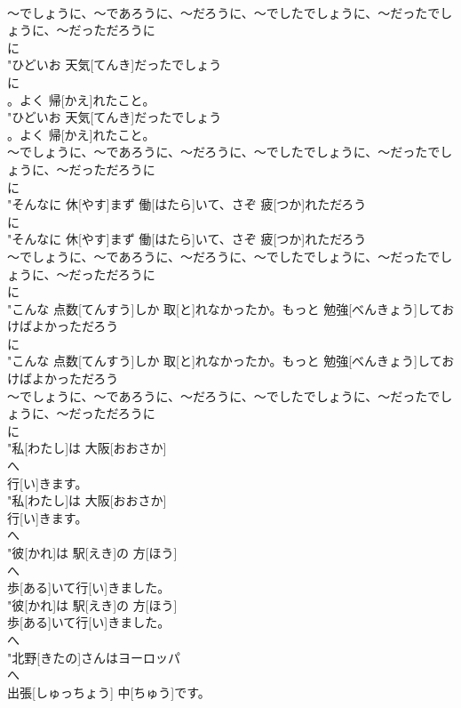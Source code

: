 \documentclass[8pt]{extreport}
\begin{document}
\begin{CJK}{UTF8}{min}
\\	～でしょうに、～であろうに、～だろうに、～でしたでしょうに、～だったでしょうに、～だっただろうに	
\\	に
\\	"ひどいお 天気[てんき]だったでしょう
\\	に
\\	。よく 帰[かえ]れたこと。
\\	"ひどいお 天気[てんき]だったでしょう
\\	。よく 帰[かえ]れたこと。
\\	～でしょうに、～であろうに、～だろうに、～でしたでしょうに、～だったでしょうに、～だっただろうに	
\\	に
\\	"そんなに 休[やす]まず 働[はたら]いて、さぞ 疲[つか]れただろう
\\	に
\\	"そんなに 休[やす]まず 働[はたら]いて、さぞ 疲[つか]れただろう
\\	～でしょうに、～であろうに、～だろうに、～でしたでしょうに、～だったでしょうに、～だっただろうに	
\\	に
\\	"こんな 点数[てんすう]しか 取[と]れなかったか。もっと 勉強[べんきょう]しておけばよかっただろう
\\	に
\\	"こんな 点数[てんすう]しか 取[と]れなかったか。もっと 勉強[べんきょう]しておけばよかっただろう
\\	～でしょうに、～であろうに、～だろうに、～でしたでしょうに、～だったでしょうに、～だっただろうに	
\\	に
\\	"私[わたし]は 大阪[おおさか]
\\	へ
\\	行[い]きます。
\\	"私[わたし]は 大阪[おおさか]
\\	行[い]きます。
\\	へ
\\	"彼[かれ]は 駅[えき]の 方[ほう]
\\	へ
\\	歩[ある]いて行[い]きました。
\\	"彼[かれ]は 駅[えき]の 方[ほう]
\\	歩[ある]いて行[い]きました。
\\	へ
\\	"北野[きたの]さんはヨーロッパ
\\	へ
\\	出張[しゅっちょう] 中[ちゅう]です。

\end{CJK}
\end{document}
